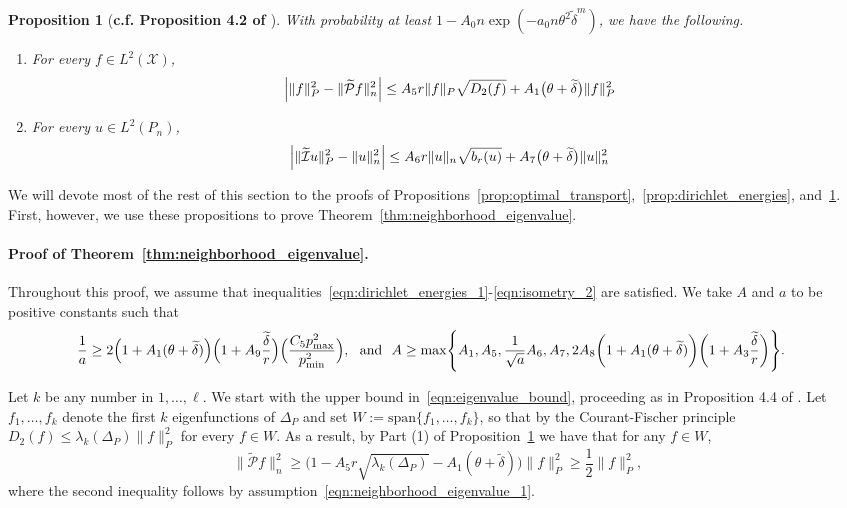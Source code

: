 \documentclass[twoside]{article}
\newcommand{\1}{\mathbf{1}}
\newcommand{\Xset}{\mathcal{X}}
\newcommand{\Leb}{L}
\newcommand{\mc}[1]{\mathcal{#1}}
\newcommand{\wt}[1]{\widetilde{#1}}
\newtheorem{proposition}{Proposition}
\theoremstyle{definition}
\theoremstyle{remark}
\begin{document}
\begin{proposition}[\textbf{c.f. Proposition 4.2 of \citet{calder2019}}]
	\label{prop:isometry}
	With probability at least $1 - A_0n\exp(-a_0n\theta^2\wt{\delta}^{m})$, we have the following.
	\begin{enumerate}[(1)]
		\item For every $f \in \Leb^2(\Xset)$,
		\begin{equation}
		\label{eqn:isometry_1}
		\Bigl|\|f\|_{P}^2 - \|\wt{\mc{P}}f\|_{n}^2\Bigr| \leq A_5 r \|f\|_{P} \sqrt{D_2(f)} + A_1\bigl(\theta + \wt{\delta}\bigr)\|f\|_{P}^2
		\end{equation}
		\item For every $u \in \Leb^2(P_n)$,
		\begin{equation}
		\label{eqn:isometry_2}
		\Bigl|\|\wt{\mc{I}}u\|_{P}^2 - \|u\|_{n}^2\Bigr| \leq A_6 r \|u\|_{n} \sqrt{b_r(u)} + A_7\bigl(\theta + \wt{\delta}\bigr) \|u\|_{n}^2
		\end{equation}
	\end{enumerate}
\end{proposition}

We will devote most of the rest of this section to the proofs of Propositions~\ref{prop:optimal_transport},~\ref{prop:dirichlet_energies}, and~\ref{prop:isometry}. First, however, we use these propositions to prove Theorem~\ref{thm:neighborhood_eigenvalue}.

\paragraph{Proof of Theorem~\ref{thm:neighborhood_eigenvalue}.}
Throughout this proof, we assume that inequalities~\eqref{eqn:dirichlet_energies_1}-\eqref{eqn:isometry_2} are satisfied. We take $A$ and $a$ to be positive constants such that
\begin{align*}
\frac{1}{a} & \geq 2\Bigl(1 + A_1(\theta + \wt{\delta})\Bigr)\Bigl(1 + A_9\frac{\wt{\delta}}{r}\Bigr)\Bigl(\frac{C_5 p_{\max}^2}{p_{\min}^2}\Bigr) ,~~\textrm{and}~~A \geq \max\Biggl\{A_1,A_5, \frac{1}{\sqrt{a}}A_6, A_7, 2A_8\biggl(1 + A_1(\theta + \wt{\delta})\biggr) \biggl(1 + A_3\frac{\wt{\delta}}{r}\biggr) \Biggr\}.
\end{align*}

Let $k$ be any number in $1,\ldots,\ell$. We start with the upper bound in~\eqref{eqn:eigenvalue_bound}, proceeding as in Proposition 4.4 of \citet{burago2014}. Let $f_1,\ldots,f_{k}$ denote the first $k$ eigenfunctions of $\Delta_P$ and set $W := \mathrm{span}\{f_1,\ldots,f_k\}$, so that by the Courant-Fischer principle $D_2(f) \leq \lambda_k(\Delta_P) \|f\|_{P}^2$ for every $f \in W$. As a result, by Part (1) of Proposition~\ref{prop:isometry} we have that for any $f \in W$,
\begin{equation*}
\bigl\|\wt{\mc{P}}f\bigr\|_{n}^2 \geq \biggl(1 - A_5r \sqrt{\lambda_{k}(\Delta_P)} - A_1(\theta + \wt{\delta})\biggr)\|f\|_{P}^2  \geq \frac{1}{2} \|f\|_{P}^2,
\end{equation*}
where the second inequality follows by assumption~\eqref{eqn:neighborhood_eigenvalue_1}. 
\end{document}
